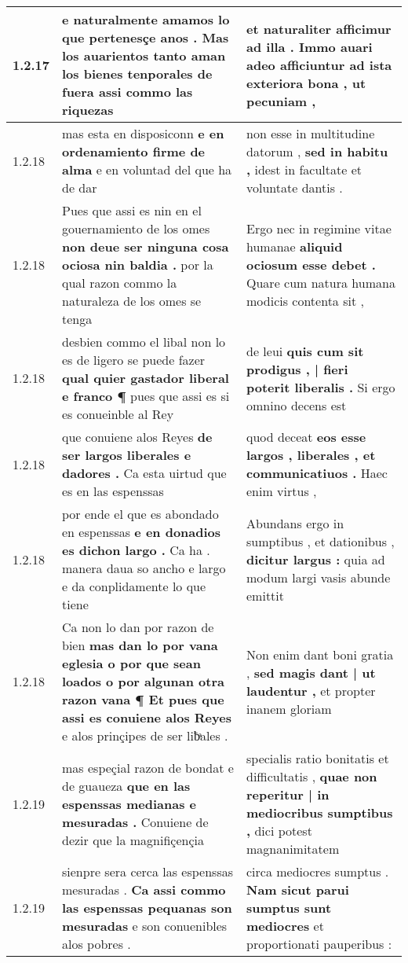 \begin{tabular}{|p{1cm}|p{6.5cm}|p{6.5cm}|}
1.2.17 & e naturalmente amamos lo que pertenesçe anos . \textbf{ Mas los auarientos tanto aman los bienes tenporales de fuera } assi commo las riquezas & et naturaliter afficimur ad illa . Immo auari adeo afficiuntur \textbf{ ad ista exteriora bona , } ut pecuniam , \\\hline
1.2.18 & mas esta en disposiconn \textbf{ e en ordenamiento firme de alma } e en voluntad del que ha de dar & non esse in multitudine datorum , \textbf{ sed in habitu , } idest in facultate et voluntate dantis . \\\hline
1.2.18 & Pues que assi es nin en el gouernamiento de los omes \textbf{ non deue ser ninguna cosa ociosa nin baldia . } por la qual razon commo la naturaleza de los omes se tenga & Ergo nec in regimine vitae humanae \textbf{ aliquid ociosum esse debet . } Quare cum natura humana modicis contenta sit , \\\hline
1.2.18 & desbien commo el libal non lo es de ligero se puede fazer \textbf{ qual quier gastador liberal e franco ¶ } pues que assi es si es conueinble al Rey & de leui \textbf{ quis cum sit prodigus , | fieri poterit liberalis . } Si ergo omnino decens est \\\hline
1.2.18 & que conuiene alos Reyes \textbf{ de ser largos liberales e dadores . } Ca esta uirtud que es en las espenssas & quod deceat \textbf{ eos esse largos , liberales , et communicatiuos . } Haec enim virtus , \\\hline
1.2.18 & por ende el que es abondado en espenssas \textbf{ e en donadios es dichon largo . } Ca ha . manera daua so ancho e largo e da conplidamente lo que tiene & Abundans ergo in sumptibus , et dationibus , \textbf{ dicitur largus : } quia ad modum largi vasis abunde emittit \\\hline
1.2.18 & Ca non lo dan por razon de bien \textbf{ mas dan lo por vana eglesia o por que sean loados o por algunan otra razon vana ¶ Et pues que assi es conuiene alos Reyes } e alos prinçipes de ser liƀͣales . & Non enim dant boni gratia , \textbf{ sed magis dant | ut laudentur , } et propter inanem gloriam \\\hline
1.2.19 & mas espeçial razon de bondat e de guaueza \textbf{ que en las espenssas medianas e mesuradas . } Conuiene de dezir que la magnifiçençia & specialis ratio bonitatis et difficultatis , \textbf{ quae non reperitur | in mediocribus sumptibus , } dici potest magnanimitatem \\\hline
1.2.19 & sienpre sera cerca las espenssas mesuradas . \textbf{ Ca assi commo las espenssas pequanas son mesuradas } e son conuenibles alos pobres . & circa mediocres sumptus . \textbf{ Nam sicut parui sumptus sunt mediocres } et proportionati pauperibus : \\\hline

\end{tabular}
